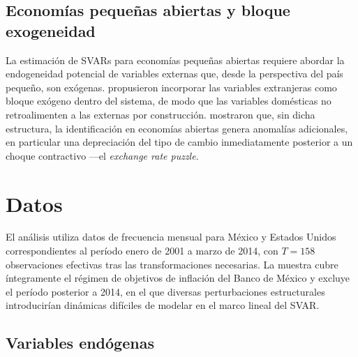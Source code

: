 \documentclass[12pt,a4paper]{article}
\begin{document}
\subsection{Economías pequeñas abiertas y bloque exogeneidad}

La estimación de SVARs para economías pequeñas abiertas requiere abordar la endogeneidad potencial de variables externas que, desde la perspectiva del país pequeño, son exógenas.
\citet{cushmanZha1997} propusieron incorporar las variables extranjeras como bloque
exógeno dentro del sistema, de modo que las variables domésticas no retroalimenten a
las externas por construcción.
\citet{kimroubini2000} mostraron que, sin dicha estructura, la identificación en economías
abiertas genera anomalías adicionales, en particular una depreciación del tipo de cambio
inmediatamente posterior a un choque contractivo —el \textit{exchange rate puzzle}.



\section{Datos}
\label{sec:datos}

El análisis utiliza datos de frecuencia mensual para México y Estados Unidos
correspondientes al período enero de 2001 a marzo de 2014, con $T = 158$ observaciones
efectivas tras las transformaciones necesarias.
La muestra cubre íntegramente el régimen de objetivos de inflación del Banco de México
y excluye el período posterior a 2014, en el que diversas perturbaciones estructurales
introducirían dinámicas difíciles de modelar en el marco lineal del SVAR.

\subsection{Variables endógenas}
\end{document}
